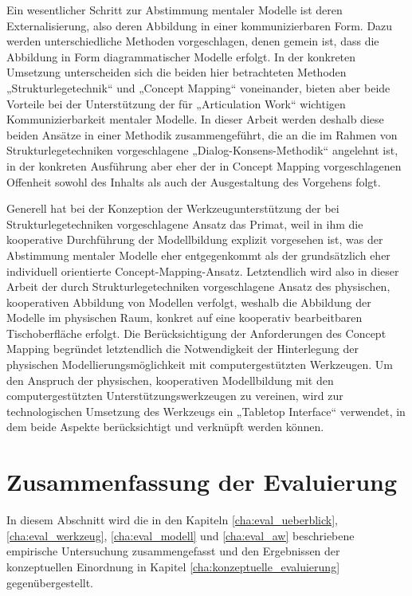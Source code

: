 Ein wesentlicher Schritt zur Abstimmung mentaler Modelle ist deren Externalisierung, also deren Abbildung in einer kommunizierbaren Form. Dazu werden unterschiedliche Methoden vorgeschlagen, denen gemein ist, dass die Abbildung in Form diagrammatischer Modelle erfolgt. In der konkreten Umsetzung unterscheiden sich die beiden hier betrachteten Methoden „Strukturlegetechnik“ und „Concept Mapping“ voneinander, bieten aber beide Vorteile bei der Unterstützung der für „Articulation Work“ wichtigen Kommunizierbarkeit mentaler Modelle. In dieser Arbeit werden deshalb diese beiden Ansätze in einer Methodik zusammengeführt, die an die im Rahmen von Strukturlegetechniken vorgeschlagene „Dialog-Konsens-Methodik“ angelehnt ist, in der konkreten Ausführung aber eher der in Concept Mapping vorgeschlagenen Offenheit sowohl des Inhalts als auch der Ausgestaltung des Vorgehens folgt. 

Generell hat bei der Konzeption der Werkzeugunterstützung der bei Strukturlegetechniken vorgeschlagene Ansatz das Primat, weil in ihm die kooperative Durchführung der Modellbildung explizit vorgesehen ist, was der Abstimmung mentaler Modelle eher entgegenkommt als der grundsätzlich eher individuell orientierte Concept-Mapping-Ansatz. Letztendlich wird also in dieser Arbeit der durch Strukturlegetechniken vorgeschlagene Ansatz des physischen, kooperativen Abbildung von Modellen verfolgt, weshalb die Abbildung der Modelle im physischen Raum, konkret auf eine kooperativ bearbeitbaren Tischoberfläche erfolgt. Die Berücksichtigung der Anforderungen des Concept Mapping begründet letztendlich die Notwendigkeit der Hinterlegung der physischen Modellierungsmöglichkeit mit computergestützten Werkzeugen. Um den Anspruch der physischen, kooperativen Modellbildung mit den computergestützten Unterstützungswerkzeugen zu vereinen, wird zur technologischen Umsetzung des Werkzeugs ein „Tabletop Interface“ verwendet, in dem beide Aspekte berücksichtigt und verknüpft werden können.


\section{Zusammenfassung der Evaluierung}
\label{sec:zusammenfassung_der_evaluierung}

In diesem Abschnitt wird die in den Kapiteln \ref{cha:eval_ueberblick}, \ref{cha:eval_werkzeug}, \ref{cha:eval_modell} und \ref{cha:eval_aw} beschriebene empirische Untersuchung zusammengefasst und den Ergebnissen der konzeptuellen Einordnung in Kapitel \ref{cha:konzeptuelle_evaluierung} gegenübergestellt.

